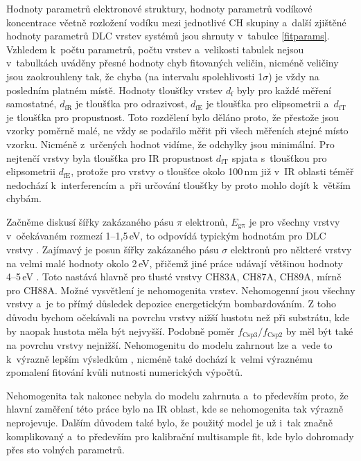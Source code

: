 Hodnoty parametrů elektronové struktury, hodnoty parametrů vodíkové koncentrace včetně rozložení vodíku mezi jednotlivé CH skupiny a~další zjištěné hodnoty parametrů DLC vrstev systémů jsou shrnuty v~tabulce \ref{fitparams}. Vzhledem k~počtu parametrů, počtu vrstev a~velikosti tabulek nejsou v~tabulkách uváděny přesné hodnoty chyb fitovaných veličin, nicméně veličiny jsou zaokrouhleny tak, že chyba (na intervalu spolehlivosti 1$\sigma$) je vždy na posledním platném místě. Hodnoty tloušťky vrstev $d_\mathrm{f}$ byly pro každé měření samostatné, $d_\mathrm{fR}$ je tloušťka pro odrazivost, $d_\mathrm{fE}$ je tloušťka pro elipsometrii a~$d_\mathrm{fT}$ je tloušťka pro propustnost. Toto rozdělení bylo děláno proto, že přestože jsou vzorky poměrně malé, ne vždy se podařilo měřit při všech měřeních stejné místo vzorku. Nicméně z~určených hodnot vidíme, že odchylky jsou minimální. Pro nejtenčí vrstvy byla tloušťka pro IR propustnost $d_\mathrm{fT}$ spjata s~tloušťkou pro elipsometrii $d_\mathrm{fE}$, protože pro vrstvy o tloušťce okolo 100\,nm již v~IR oblasti téměř nedochází k~interferencím a~při určování tloušťky by proto mohlo dojít k~větším chybám. 

Začněme diskusí šířky zakázaného pásu $\pi$ elektronů, $E_\mathrm{g\pi}$ je pro všechny vrstvy v~očekávaném rozmezí 1--1,5\,eV, to odpovídá typickým hodnotám pro DLC vrstvy \cite{Demichelis1992, Franta2007}. 
Zajímavý je posun šířky zakázaného pásu $\sigma$ elektronů pro některé vrstvy na velmi malé hodnoty okolo 2\,eV, přičemž jiné práce udávají většinou hodnoty 4--5\,eV \cite{Demichelis1992, Franta2011}. Toto nastává hlavně pro tlusté vrstvy CH83A, CH87A, CH89A, mírně pro CH88A. Možné vysvětlení je nehomogenita vrstev. Nehomogenní jsou všechny vrstvy a~je to přímý důsledek de\-po\-zi\-ce energetickým bombardováním. 
Z toho důvodu bychom očekávali na povrchu vrstvy nižší hustotu než při substrátu, kde by naopak hustota měla být nejvyšší. Podobně poměr $f_\mathrm{Csp3}/f_\mathrm{Csp2}$ by měl být také na povrchu vrstvy nejnižší. Nehomogenitu do modelu zahrnout lze a~vede to k~výrazně lepším výsledkům \cite{Franta2011}, nicméně také dochází k~velmi výraznému zpomalení fitování kvůli nutnosti numerických výpočtů. 

Nehomogenita tak nakonec nebyla do modelu zahrnuta a~to především proto, že hlavní zaměření této práce bylo na IR oblast, kde se nehomogenita tak výrazně neprojevuje. Dalším důvodem také bylo, že použitý model je už i~tak značně komplikovaný a~to především pro kalibrační multisample fit, kde bylo dohromady přes sto volných parametrů. 


